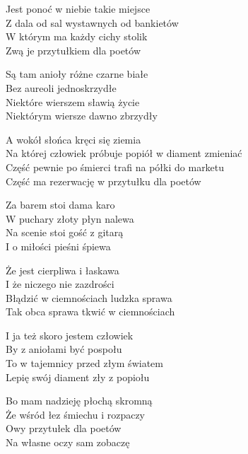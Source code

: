 \begin{text}
    Jest ponoć w niebie takie miejsce\\
    Z dala od sal wystawnych od bankietów\\
    W którym ma każdy cichy stolik\\
    Zwą je przytułkiem dla poetów

    Są tam anioły różne czarne białe\\
    Bez aureoli jednoskrzydłe\\
    Niektóre wierszem sławią życie\\
    Niektórym wiersze dawno zbrzydły

    \vin A wokół słońca kręci się ziemia\\
    \vin Na której człowiek próbuje popiół w diament zmieniać\\
    \vin Część pewnie po śmierci trafi na półki do marketu\\
    \vin Część ma rezerwację w przytułku dla poetów

    Za barem stoi dama karo\\
    W puchary złoty płyn nalewa\\
    Na scenie stoi gość z gitarą\\
    I o miłości pieśni śpiewa

    Że jest cierpliwa i łaskawa\\
    I że niczego nie zazdrości\\
    Błądzić w ciemnościach ludzka sprawa\\
    Tak obca sprawa tkwić w ciemnościach

    I ja też skoro jestem człowiek\\
    By z aniołami być pospołu\\
    To w tajemnicy przed złym światem\\
    Lepię swój diament zły z popiołu

    Bo mam nadzieję płochą skromną\\
    Że wśród łez śmiechu i rozpaczy\\
    Owy przytułek dla poetów\\
    Na własne oczy sam zobaczę
\end{text}
